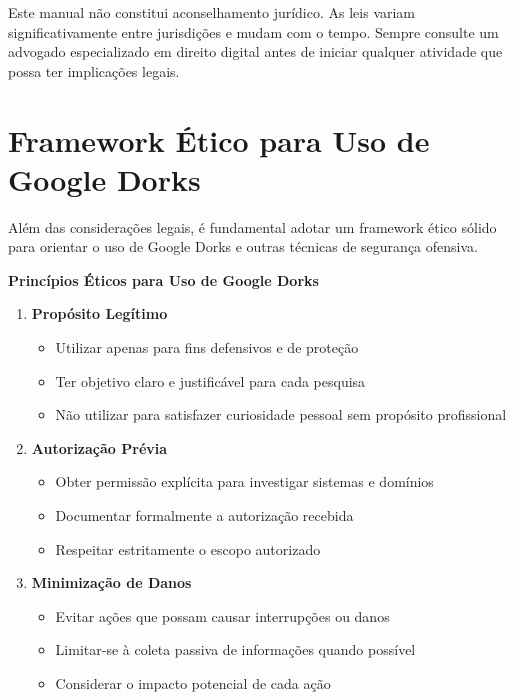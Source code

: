 \documentclass[12pt,a4paper]{book}
\begin{document}
\begin{alertbox}
Este manual não constitui aconselhamento jurídico. As leis variam significativamente entre jurisdições e mudam com o tempo. Sempre consulte um advogado especializado em direito digital antes de iniciar qualquer atividade que possa ter implicações legais.
\end{alertbox}

\section{Framework Ético para Uso de Google Dorks}

Além das considerações legais, é fundamental adotar um framework ético sólido para orientar o uso de Google Dorks e outras técnicas de segurança ofensiva.

\begin{mdframed}[backgroundcolor=roxoconhecimento!10, roundcorner=10pt, leftmargin=1cm, rightmargin=1cm]
\begin{center}
\textbf{\large Princípios Éticos para Uso de Google Dorks}
\end{center}

\begin{enumerate}
    \item \textbf{Propósito Legítimo}
    \begin{itemize}
        \item Utilizar apenas para fins defensivos e de proteção
        \item Ter objetivo claro e justificável para cada pesquisa
        \item Não utilizar para satisfazer curiosidade pessoal sem propósito profissional
    \end{itemize}
    
    \item \textbf{Autorização Prévia}
    \begin{itemize}
        \item Obter permissão explícita para investigar sistemas e domínios
        \item Documentar formalmente a autorização recebida
        \item Respeitar estritamente o escopo autorizado
    \end{itemize}
    
    \item \textbf{Minimização de Danos}
    \begin{itemize}
        \item Evitar ações que possam causar interrupções ou danos
        \item Limitar-se à coleta passiva de informações quando possível
        \item Considerar o impacto potencial de cada ação
    \end{itemize}
    

\end{enumerate}
\end{mdframed}
\end{document}
